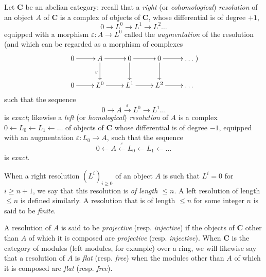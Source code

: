 \begin{env}[11.4.1]
\label{0.11.4.1}
Let $\boldsymbol{C}$ be an abelian category; recall that a
\emph{right} (or \emph{cohomological}) \emph{resolution} of an object $A$ of
$\boldsymbol{C}$ is a complex of objects of $\boldsymbol{C}$, whose
differential is of degree $+1$,
\[
  0\longrightarrow L^0\longrightarrow L^1\longrightarrow L^2
  \ldots
\]
equipped with a morphism $\varepsilon:A\to L^0$ called the \emph{augmentation} of the
resolution (and which can be regarded as a morphism of complexes
\[
\xymatrix{
  0\ar[r] & A\ar[r]\ar[d]_{\varepsilon} & 0\ar[r]\ar[d]
    & 0\ar[r]\ar[d] & \ldots\\
  0\ar[r] & L^0\ar[r] & L^1\ar[r] & L^2\ar[r] & \ldots
})
\]
such that the sequence
\[
  0\longrightarrow A\xrightarrow{\varepsilon}L^0\longrightarrow L^1
  \ldots
\]
is \emph{exact}; likewise a \emph{left} (or \emph{homological}) \emph{resolution}
of $A$ is a complex
$0\leftarrow L_0\leftarrow L_1\leftarrow\ldots$ of objects of $\boldsymbol{C}$
whose differential is of degree $-1$, equipped with an augmentation
$\varepsilon:L_0\to A$, such that the sequence
\[
  0\longleftarrow A\xleftarrow{\varepsilon}L_0\longleftarrow L_1
  \longleftarrow\ldots
\]
is \emph{exact}.

When a right resolution $(L^i)_{i\geq0}$ of an object $A$ is such that
$L^i=0$ for $i\geq n+1$, we say that this resolution is \emph{of
length $\leq n$}. A left resolution of length $\leq n$ is defined
similarly. A resolution that is of length $\leq n$ for some integer
$n$ is said to be \emph{finite}.

A resolution of $A$ is said to be \emph{projective} (resp. \emph{injective}) if
the objects of $\boldsymbol{C}$ other than $A$ of which it is composed are
\emph{projective} (resp. \emph{injective}). When $\boldsymbol{C}$ is the
category of modules (left modules, for example) over a ring, we will likewise say
that a resolution of $A$ is \emph{flat} (resp. \emph{free}) when the
modules other than $A$ of which it is composed are \emph{flat} (resp.
\emph{free}).
\end{env}

